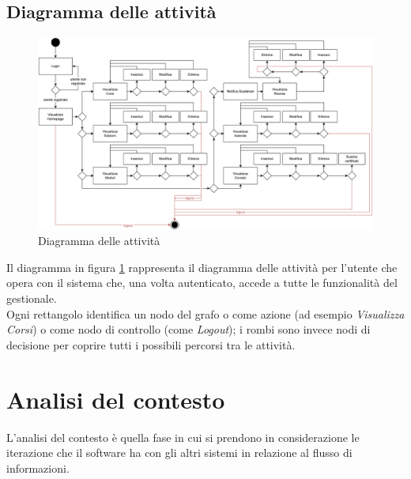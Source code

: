 \subsection{Diagramma delle attività}
\begin{figure}[h]
\centering
\includegraphics[scale=0.55]{img/Diagramma delle attivita.jpg}
\caption{Diagramma delle attività}
\label{fig:Diagrammadelleattivita}
\end{figure}
\noindent
Il diagramma in figura \ref{fig:Diagrammadelleattivita} rappresenta il diagramma delle attività per l'utente che opera con il sistema che, una volta autenticato, accede a tutte le funzionalità del gestionale.\\
Ogni rettangolo identifica un nodo del grafo o come azione (ad esempio \textit{Visualizza Corsi}) o come nodo di controllo (come \textit{Logout}); i rombi sono invece nodi di decisione per coprire tutti i possibili percorsi tra le attività.



\section{Analisi del contesto}
\label{sec:contesto}
L'analisi del contesto è quella fase in cui si prendono in considerazione le iterazione che il software ha con gli altri sistemi in relazione al flusso di informazioni.

